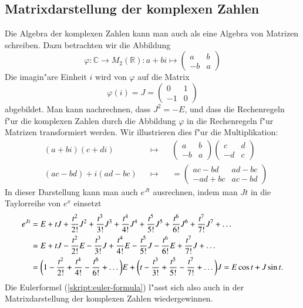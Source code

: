 \subsection{Matrixdarstellung der komplexen Zahlen\label{subsection:matrixdarstellung}}
Die Algebra der komplexen Zahlen kann man auch als eine Algebra von Matrizen
schreiben. Dazu betrachten wir die Abbildung
\[
\varphi\colon
\mathbb C\to M_2(\mathbb R):
a+bi\mapsto\begin{pmatrix}a&b\\-b&a\end{pmatrix}
\]
Die imagin"are Einheit $i$ wird von $\varphi$ auf die Matrix
\[
\varphi(i)=J=\begin{pmatrix}0&1\\-1&0\end{pmatrix}
\]
abgebildet. Man kann nachrechnen, dass $J^2=-E$, und dass die Rechenregeln
f"ur die komplexen Zahlen durch die Abbildung $\varphi$ in die Rechenregeln
f"ur Matrizen transformiert werden.
Wir illustrieren dies f"ur die Multiplikation:
\[
\begin{aligned}
&(a+bi)(c+di)&&\mapsto&
&\begin{pmatrix}a&b\\-b&a\end{pmatrix}
\begin{pmatrix}c&d\\-d&c\end{pmatrix}
\\
&(ac-bd) + i(ad-bc)&&\mapsto&
&=\begin{pmatrix}
ac-bd&ad-bc\\
-ad+bc&ac-bd
\end{pmatrix}
\end{aligned}
\]
In dieser Darstellung kann man auch $e^{Jt}$ ausrechnen, indem man $Jt$ in
die Taylorreihe von $e^x$ einsetzt
\begin{align}
e^{Jt}
&=
E + tJ + \frac{t^2}{2!} J^2 + \frac{t^3}{3!} J^3 + \frac{t^4}{4!} J^4
 + \frac{t^5}{5!} J^5 + \frac{t^6}{6!} J^6 + \frac{t^7}{7!} J^7 + \dots
\notag
\\
&=
E + tJ - \frac{t^2}{2!} E - \frac{t^3}{3!} J + \frac{t^4}{4!} E
 - \frac{t^5}{5!} J - \frac{t^6}{6!} E + \frac{t^7}{7!} J + \dots
\notag
\\
&=\biggl(1 - \frac{t^2}{2!} + \frac{t^4}{4!} - \frac{t^6}{6!} + \dots\biggr) E
+ \biggl(t - \frac{t^3}{3!} + \frac{t^5}{5!} - \frac{t^7}{7!} + \dots\biggr) J
= E \cos t + J \sin t.
\label{skript:eulermatrixdarstellung}
\end{align}
Die Eulerformel (\ref{skript:euler-formula}) l"asst sich also auch in der
Matrixdarstellung der komplexen Zahlen wiedergewinnen.

